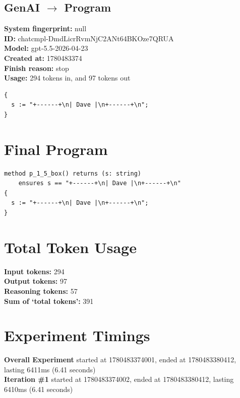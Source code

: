 \documentclass{article}
\begin{document}
\subsection*{GenAI $\rightarrow$ Program}
\textbf{System fingerprint: }null
\\\textbf{ID: }chatcmpl-DmdLicrRvmNjC2ANt64BKOze7QRUA
\\\textbf{Model: }gpt-5.5-2026-04-23
\\\textbf{Created at: }1780483374
\\\textbf{Finish reason: }stop
\\\textbf{Usage: }294 tokens in, and 97 tokens out
\begin{lstlisting}
{
  s := "+------+\n| Dave |\n+------+\n";
}
\end{lstlisting}
\section*{Final Program}
\begin{lstlisting}
method p_1_5_box() returns (s: string)
	ensures s == "+------+\n| Dave |\n+------+\n"
{
  s := "+------+\n| Dave |\n+------+\n";
}
\end{lstlisting}
\section*{Total Token Usage}
\textbf{Input tokens: }294
\\\textbf{Output tokens: }97
\\\textbf{Reasoning tokens: }57
\\\textbf{Sum of `total tokens': }391
\section*{Experiment Timings}
\textbf{Overall Experiment} started at 1780483374001, ended at 1780483380412, lasting 6411ms (6.41 seconds)
\\\textbf{Iteration \#1} started at 1780483374002, ended at 1780483380412, lasting 6410ms (6.41 seconds)
\end{document}
